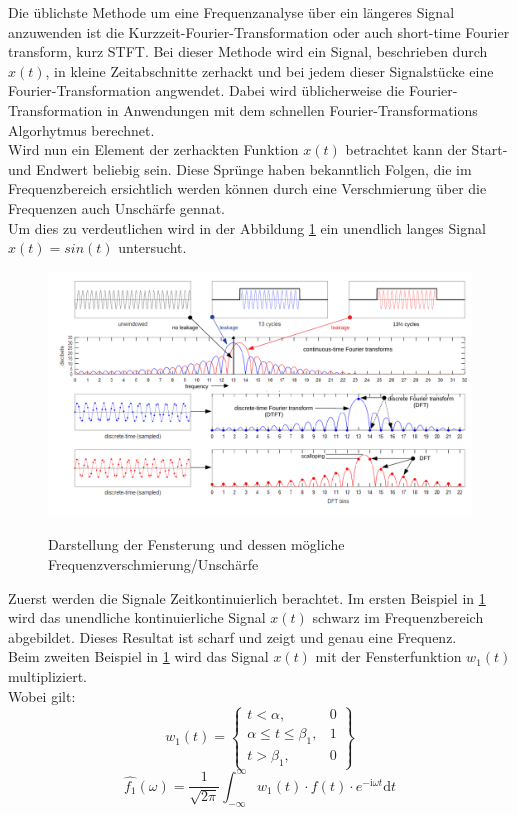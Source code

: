 
Die üblichste Methode um eine Frequenzanalyse über ein längeres Signal anzuwenden ist die  Kurzzeit-Fourier-Transformation oder auch short-time Fourier transform, kurz STFT. Bei dieser Methode wird ein Signal, beschrieben durch $x(t)$, in kleine Zeitabschnitte zerhackt und bei jedem dieser Signalstücke eine Fourier-Transformation angwendet. Dabei wird üblicherweise die Fourier-Transformation in Anwendungen mit dem schnellen Fourier-Transformations Algorhytmus berechnet.\\

Wird nun ein Element der zerhackten Funktion $x(t)$ betrachtet kann der Start- und Endwert beliebig sein. Diese Sprünge haben bekanntlich Folgen, die im Frequenzbereich ersichtlich werden können durch eine Verschmierung über die Frequenzen auch Unschärfe gennat. \\

Um dies zu verdeutlichen wird in der Abbildung \ref{fig:Spectral} ein unendlich langes Signal $x(t)=sin(t)$ untersucht. 
\begin{figure}[!ht]
	\centering
	\includegraphics[scale=0.8]{papers/autotune/sections/fft/images/windows/Spectral.pdf}
	\caption{Darstellung der Fensterung und dessen mögliche Frequenzverschmierung/Unschärfe}\cite{wikipedia:Window}
	\label{fig:Spectral}
\end{figure}%

Zuerst werden die Signale Zeitkontinuierlich berachtet. Im ersten Beispiel in \ref{fig:Spectral} wird das unendliche kontinuierliche Signal $x(t)$ schwarz im Frequenzbereich abgebildet. Dieses Resultat ist scharf und zeigt und genau eine Frequenz.\\

Beim zweiten Beispiel in \ref{fig:Spectral} wird das Signal $x(t)$ mit der Fensterfunktion $w_{1}(t)$ multipliziert.\\
Wobei gilt: 
\begin{equation}
	w_{1}(t)= \left\{\begin{array}{lll}{t<\alpha,} & {0} \\ {\alpha\leq t \leq\beta_{1},} & {1}\\ {t>\beta_{1},}&{0}\end{array}\right\}
\end{equation}
\begin{equation}
	\hat{f_{1}}(\omega)=\frac{1}{\sqrt{2 \pi}} \int_{-\infty}^{\infty} w_{1}(t)\cdot f(t) \cdot e^{-\mathrm{i} \omega t} \mathrm{d} t
\end{equation}


